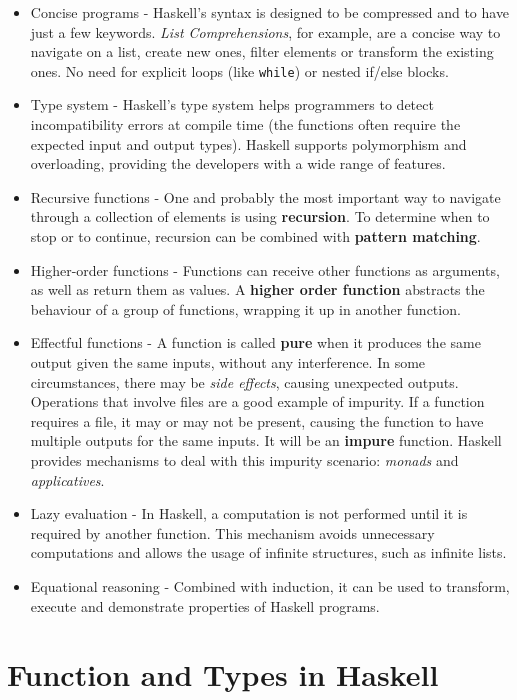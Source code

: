 \begin{itemize}\label{lsthbenefits}
\item Concise programs - Haskell's syntax is designed to be compressed and to have just a few keywords. \textit{List Comprehensions}, for example, are a concise way to navigate on a list, create new ones, filter elements or transform the existing ones. No need for explicit loops (like \lstinline!while!) or nested if/else blocks.
\item Type system - Haskell's type system helps programmers to detect incompatibility errors at compile time (the functions often require the expected input and output types). Haskell supports polymorphism and overloading, providing the developers with a wide range of features.
\item Recursive functions - One and probably the most important way to navigate through a collection of elements is using \textbf{recursion}. To determine when to stop or to continue, recursion can be combined with \textbf{pattern matching}.
\item Higher-order functions - Functions can receive other functions as arguments, as well as return them as values. A \textbf{higher order function} abstracts the behaviour of a group of functions, wrapping it up in another function.
\item Effectful functions - A function is called \textbf{pure} when it produces the same output given the same inputs, without any interference. In some circumstances, there may be \textit{side effects}, causing unexpected outputs. Operations that involve files are a good example of impurity. If a function requires a file, it may or may not be present, causing the function to have multiple outputs for the same inputs. It will be an \textbf{impure} function. Haskell provides mechanisms to deal with this impurity scenario: \textit{monads} and \textit{applicatives}.
\item Lazy evaluation - In Haskell, a computation is not performed until it is required by another function. This mechanism avoids unnecessary computations and allows the usage of infinite structures, such as infinite lists.
\item Equational reasoning - Combined with induction, it can be used to transform, execute and demonstrate properties of Haskell programs.
\end{itemize}


\section{Function and Types in Haskell}

